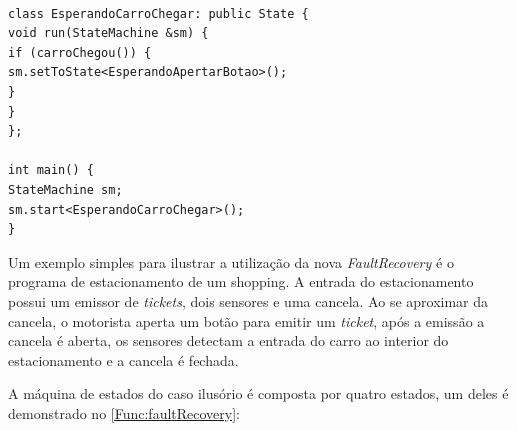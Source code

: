 \newpage
\begin{lstlisting}[label=Func:faultRecovery,caption={[Exemplo de criação de um estado]A classe EsperandoCarroChegar herda da classe State e tem sua rotina implementada no método run, ao encerrar a rotina o método \textit{setToState} é invocado, alterando o estado atual. No método main um objeto StateMachine é instanciado e o método \textit{start} é chamado, iniciando a máquina de estados. Este quadro tem como objetivo demonstrar a utilização da biblioteca, apenas um estado será posto no quadro, os demais serão anexados ao trabalho.}]

class EsperandoCarroChegar: public State {
void run(StateMachine &sm) {
if (carroChegou()) {
sm.setToState<EsperandoApertarBotao>();
}
}
};

int main() {
StateMachine sm;
sm.start<EsperandoCarroChegar>();
}

\end{lstlisting}

Um exemplo simples para ilustrar a utilização da nova \textit{FaultRecovery} é o programa de estacionamento de um shopping. A entrada do estacionamento possui um emissor de \textit{tickets}, dois sensores e uma cancela. Ao se aproximar da cancela, o motorista aperta um botão para emitir um \textit{ticket}, após a emissão a cancela é aberta, os sensores detectam a entrada do carro ao interior do estacionamento e a cancela é fechada.

A máquina de estados do caso ilusório é composta por quatro estados, um deles é demonstrado no \autoref{Func:faultRecovery}:

